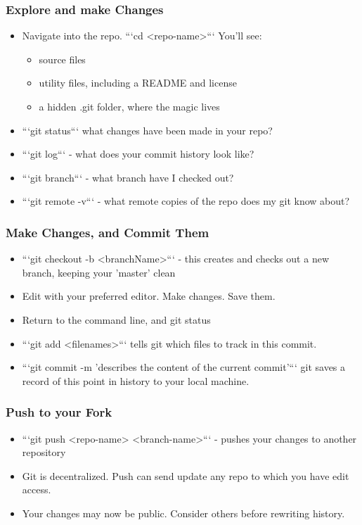 \documentclass[unknownkeysallowed]{beamer}
\begin{document}
\begin{frame}
    \frametitle{Explore and make Changes}
    \begin{itemize}
        \item{Navigate into the repo. ```cd <repo-name>``` You'll see:}
            \begin{itemize}
              \item{source files}
              \item{utility files, including a README and license}
              \item{a hidden .git folder, where the magic lives}
            \end{itemize}
        \item{```git status``` what changes have been made in your repo?}
        \item{```git log``` - what does your commit history look like?}
        \item{```git branch``` - what branch have I checked out?}
        \item{```git remote -v``` - what remote copies of the repo does my git know about?}
    \end{itemize}
    \vspace{1cm} %
\end{frame}

\begin{frame}
    \frametitle{Make Changes, and Commit Them}
    \begin{itemize}
        \item{```git checkout -b <branchName>``` - this creates and checks out a new branch, keeping your 'master' clean}
        \item{Edit with your preferred editor. Make changes. Save them.}
        \item{Return to the command line, and git status}
        \item{```git add <filenames>``` tells git which files to track in this commit.}
        \item{```git commit -m 'describes the content of the current commit'``` git saves a record of this point in history to your local machine.}
    \end{itemize}
    \vspace{1cm} %
\end{frame}

\begin{frame}
    \frametitle{Push to your Fork}
    \begin{itemize}
        \item{```git push <repo-name> <branch-name>``` - pushes your changes to another repository }
        \item{Git is decentralized. Push can send update any repo to which you have edit access.}
        \item{Your changes may now be public. Consider others before rewriting history.}
    \end{itemize}
    \vspace{1cm} %
\end{frame}
\end{document}
